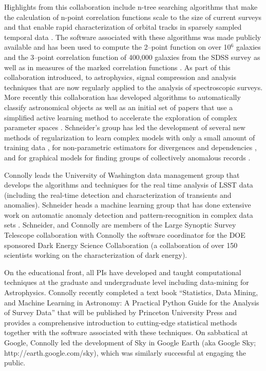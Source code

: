 \documentclass[useAMS,usenatbib,tightenlines,11pt,preprint]{aastex}
\begin{document}
Highlights from this collaboration include n-tree searching algorithms
that make the calculation of n-point correlation functions scale to
the size of current surveys \cite{GrayMoore} and that enable rapid
characterization of orbital tracks in sparsely sampled temporal data
\cite{kubica}. The software associated with these algorithms was made
publicly available and has been used to compute the 2--point function
on over 10$^6$ galaxies and the 3--point correlation function of
400,000 galaxies from the SDSS survey
\cite{Scranton2002,Szapudi2002,Nichol2006,mcbride2011a,mcbride2011b}
as well as in measures of the marked correlation functions
\cite{Skibba2006}.  As part of this collaboration \cite{yip2004a,
  vdp2009, daniel2011} introduced, to astrophysics, signal compression
and analysis techniques that are now regularly applied to the analysis
of spectroscopic surveys. More recently this collaboration has
developed algorithms to automatically classify astronomical objects
\cite{vdp2009,daniel2011} as well as an initial set of papers that use
a simplified active learning method to accelerate the exploration of
complex parameter spaces \cite{daniel2012}.  Schneider's group has led
the development of several new methods of regularization to learn
complex models with only a small amount of training data
\cite{YiZhangICML2010,YiZhangSDM2010,YiZhangMultitask2010,YiZhang2011multiECOC,YiZhang2012},
for non-parametric estimators for divergences and dependencies
\cite{poczos11alphadiv,Poczos2011UAI,poczos12CVPR}, and for graphical
models for finding groups of collectively anomalous records
\cite{Xiong2011gad,xiong2011fgm}.
 
Connolly leads the University of Washington data management group that
develops the algorithms and techniques for the real time analysis of
LSST data (including the real-time detection and characterization of
transients and anomalies).  Schneider heads a machine learning group
that has done extensive work on automatic anomaly detection and
pattern-recognition in complex data sets
\cite{Xiong2011gad,poczos12CVPR}.  Schneider, and Connolly are members
of the Large Synoptic Survey Telescope collaboration with Connolly the
software coordinator for the DOE sponsored Dark Energy Science
Collaboration (a collaboration of over 150 scientists working on the
characterization of dark energy).


On the educational front, all PIs have developed and taught computational techniques at the
graduate and undergraduate level including data-mining for
Astrophysics. Connolly recently completed a text book ``Statistics,
Data Mining, and Machine Learning in Astronomy: A Practical Python
Guide for the Analysis of Survey Data'' that will be published by
Princeton University Press and provides a comprehensive introduction
to cutting-edge statistical methods together with the software
associated with these techniques. On sabbatical at Google, Connolly led the
development of Sky in Google Earth (aka Google Sky;
http://earth.google.com/sky), which was similarly successful at
engaging the public.
\end{document}
